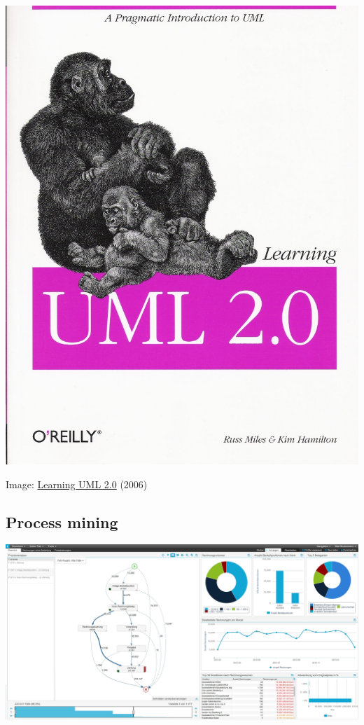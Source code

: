 \documentclass[11pt]{article}
\begin{document}
\begin{center}
\includegraphics[width=.9\linewidth]{./img/uml.jpg}
\end{center}

Image: \href{https://www.amazon.com/Learning-UML-2-0-Pragmatic-Introduction-ebook-dp-B0028N4WII/dp/B0028N4WII/}{Learning UML 2.0} (2006)

\subsection*{Process mining}
\label{sec:org685125f}

\begin{center}
\includegraphics[width=.9\linewidth]{./img/processmining.jpg}
\end{center}
\end{document}
